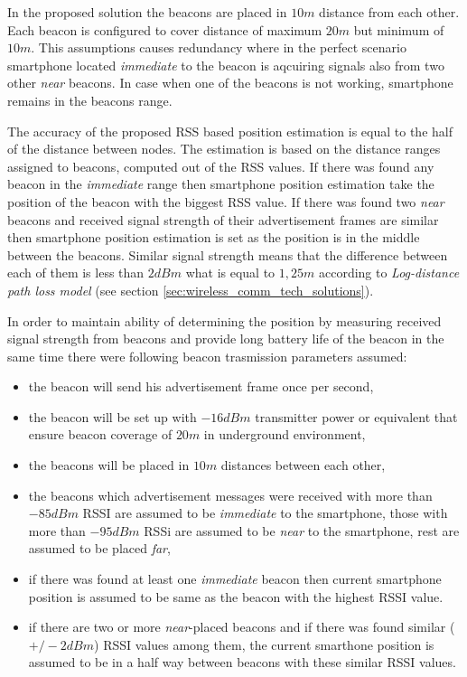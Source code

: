 \documentclass[../main.tex]{subfiles}
\begin{document}
In the proposed solution the beacons are placed in $10m$ distance from each other. Each beacon is configured to cover distance of maximum $20 m$ but minimum of $10 m$. This assumptions causes redundancy where in the perfect scenario smartphone located \textit{immediate} to the beacon is aqcuiring signals also from two other \textit{near} beacons. In case when one of the beacons is not working, smartphone remains in the beacons range.

The accuracy of the proposed RSS based position estimation is equal to the half of the distance between nodes. The estimation is based on the distance ranges assigned to beacons, computed out of the RSS values. If there was found any beacon in the \textit{immediate} range then smartphone position estimation take the position of the beacon with the biggest RSS value. If there was found two \textit{near} beacons and received signal strength of their advertisement frames are similar then smartphone position estimation is set as the position is in the middle between the beacons. Similar signal strength means that the difference between each of them is less than $2 dBm$ what is equal to $1,25 m$ according to \textit{Log-distance path loss model} (see section \ref{sec:wireless_comm_tech_solutions}).

In order to maintain ability of determining the position by measuring received signal strength from beacons and provide long battery life of the beacon in the same time there were following beacon trasmission parameters assumed:
\begin{itemize}
	\item the beacon will send his advertisement frame once per second,
	\item the beacon will be set up with $-16 dBm$ transmitter power or equivalent that ensure beacon coverage of $20 m$ in underground environment,
	\item the beacons will be placed in $10 m$ distances between each other,
	\item the beacons which advertisement messages were received with more than $-85 dBm$ RSSI are assumed to be \textit{immediate} to the smartphone, those with more than $-95 dBm$ RSSi are assumed to be \textit{near} to the smartphone, rest are assumed to be placed \textit{far},
	\item if there was found at least one \textit{immediate} beacon then current smartphone position is assumed to be same as the beacon with the highest RSSI value.
	\item if there are two or more \textit{near}-placed beacons and if there was found similar ($+/- 2 dBm$) RSSI values among them, the current smarthone position is assumed to be in a half way between beacons with these similar RSSI values.
\end{itemize}
\end{document}

